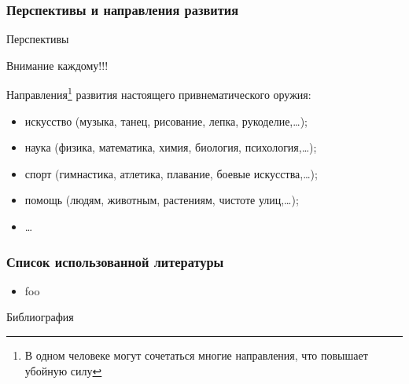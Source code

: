 \begin{frame}
    \frametitle{Перспективы и направления развития}
    
    \begin{block}{Перспективы}
        \begin{center}
            Внимание каждому!!!
        \end{center}
    \end{block}
    
    Направления\footnote{В \alert{одном} человеке могут сочетаться \alert{многие} направления, что повышает \alert{убойную силу}} развития \alert{настоящего} привнематического оружия: 
    \begin{itemize}
        \item искусство (музыка, танец, рисование, лепка, рукоделие,\ldots);
        \item наука (физика, математика, химия, биология, психология,\ldots);
        \item спорт (гимнастика, атлетика, плавание, боевые искусства,\ldots);
        \item помощь (людям, животным, растениям, чистоте улиц,\ldots);
        \item \ldots
    \end{itemize}
\end{frame}


\appendix

\begin{frame}
    \frametitle{Список использованной литературы}

    \begin{itemize}
        \item foo \cite{bib:cotelnikov}
    \end{itemize}
\end{frame}

\begin{frame}[allowframebreaks]{Библиография}
    
    
\end{frame}

